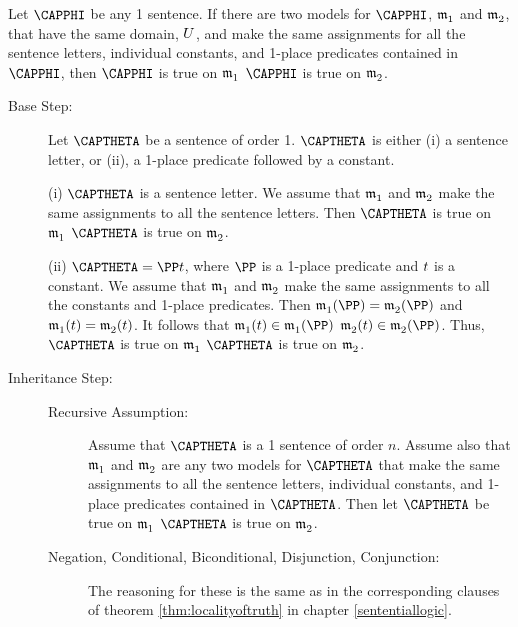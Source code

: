 \begin{THEOREM}{} 
	Let $\CAPPHI$ be any \GQL{}1 sentence.  If there are two models for $\CAPPHI$, $\mathfrak{m^{\mathrm{}}_{\mathrm{1}}}$ and $\mathfrak{m^{\mathrm{}}_{\mathrm{2}}}$, that have the same domain, $U$, and make the same assignments for all the sentence letters, individual constants, and 1-place predicates contained in $\CAPPHI$, then $\CAPPHI$ is true on $\mathfrak{m^{\mathrm{}}_{\mathrm{1}}}$ \Iff $\CAPPHI$ is true on $\mathfrak{m^{\mathrm{}}_{\mathrm{2}}}$.
\end{THEOREM}	
\begin{PROOF}
	\begin{description}
		\item[Base Step:]  Let $\CAPTHETA$ be a sentence of order 1.  $\CAPTHETA$ is either (i) a sentence letter, or (ii), a 1-place predicate followed by a constant.
		
		(i) $\CAPTHETA$ is a sentence letter.
		We assume that $\mathfrak{m^{\mathrm{}}_{\mathrm{1}}}$ and $\mathfrak{m^{\mathrm{}}_{\mathrm{2}}}$ make the same assignments to all the sentence letters.
		Then $\CAPTHETA$ is true on $\mathfrak{m^{\mathrm{}}_{\mathrm{1}}}$ \Iff $\CAPTHETA$ is true on $\mathfrak{m^{\mathrm{}}_{\mathrm{2}}}$.
		
		(ii) $\CAPTHETA=\PP\variable{t}$, where $\PP$ is a 1-place predicate and $t$ is a constant.
		We assume that $\mathfrak{m^{\mathrm{}}_{\mathrm{1}}}$ and $\mathfrak{m^{\mathrm{}}_{\mathrm{2}}}$ make the same assignments to all the constants and 1-place predicates.
		Then $\As{}{1}(\PP)=\As{}{2}(\PP)$ and $\mathfrak{m^{\mathrm{}}_{\mathrm{1}}}(t)=\mathfrak{m^{\mathrm{}}_{\mathrm{2}}}(t)$.
		It follows that $\As{}{1}(\variable{t})\in\As{}{1}(\PP)$ \Iff $\As{}{2}(\variable{t})\in\As{}{2}(\PP)$.
		Thus, $\CAPTHETA$ is true on $\mathfrak{m^{\mathrm{}}_{\mathrm{1}}}$ \Iff $\CAPTHETA$ is true on $\mathfrak{m^{\mathrm{}}_{\mathrm{2}}}$.
		
		\item[Inheritance Step:]  \hfill{}
		\begin{description}
			\item[Recursive Assumption:] Assume that $\CAPTHETA$ is a \GQL{}1 sentence of order $n$.
			Assume also that $\mathfrak{m^{\mathrm{}}_{\mathrm{1}}}$ and $\mathfrak{m^{\mathrm{}}_{\mathrm{2}}}$ are any two models for $\CAPTHETA$ that make the same assignments to all the sentence letters, individual constants, and 1-place predicates contained in $\CAPTHETA$.
			Then let $\CAPTHETA$ be true on $\mathfrak{m^{\mathrm{}}_{\mathrm{1}}}$ \Iff $\CAPTHETA$ is true on $\mathfrak{m^{\mathrm{}}_{\mathrm{2}}}$.
			
			\item[Negation, Conditional, Biconditional, Disjunction, Conjunction:]  The reasoning for these is the same as in the corresponding clauses of theorem \ref{thm:localityoftruth} in chapter \ref{sententiallogic}.
			

\end{description}
\end{description}
\end{PROOF}
